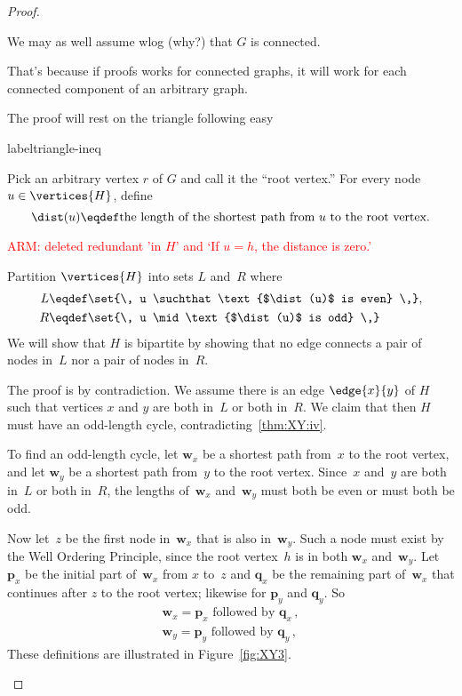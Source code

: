 \begin{proof}
\begin{description}
  We may as well assume wlog (why?) that $G$ is connected.
\begin{editingnotes}
  That's because if proofs works for connected graphs, it will work for
  each connected component of an arbitrary graph.
\end{editingnotes}

The proof will rest on the triangle following easy
\begin{lemma}label{triangle-ineq}


\end{lemma}

Pick an arbitrary vertex $r$ of $G$ and call it the ``root vertex.'' For
every node $u \in \vertices{H}$, define
\[
\dist(u)  \eqdef \text{the length of the shortest path from $u$ to
        the root vertex.}
\]
\begin{editingnotes}
\textcolor{red}{ARM: deleted redundant 'in $H$' and `If $u = h$, the distance is zero.'}
\end{editingnotes}
Partition $\vertices{H}$ into sets $L$ and~$R$ where
\begin{align*}
    L &\eqdef \set{\, u \suchthat \text{$\dist(u)$ is even} \,}, \\
    R &\eqdef \set{\, u \mid \text{$\dist(u)$ is odd} \,}
\end{align*}
We will show that $H$ is bipartite by showing that no edge connects a
pair of nodes in~$L$ nor a pair of nodes in~$R$.

The proof is by contradiction.  We assume there is an edge
$\edge{x}{y}$ of $H$ such that vertices $x$ and $y$ are both in~$L$ or
both in~$R$.  We claim that then $H$ must have an odd-length cycle,
contradicting~\ref{thm:XY:iv}.

To find an odd-length cycle, let $\mathbf{w}_x$ be a shortest path
from~$x$ to the root vertex, and let $\mathbf{w}_y$ be a shortest path
from~$y$ to the root vertex.  Since~$x$ and~$y$ are both in~$L$ or
both in~$R$, the lengths of~$\mathbf{w}_x$ and~$\mathbf{w}_y$ must
both be even or must both be odd.

Now let~$z$ be the first node in~$\mathbf{w}_x$ that is also
in~$\mathbf{w}_y$.  Such a node must exist by the Well Ordering
Principle, since the root vertex~$h$ is in both $\mathbf{w}_x$
and~$\mathbf{w}_y$.  Let $\mathbf{p}_x$ be the initial part
of~$\mathbf{w}_x$ from $x$ to~$z$ and $\mathbf{q}_x$ be the remaining
part of~$\mathbf{w}_x$ that continues after $z$ to the root vertex;
likewise for $\mathbf{p}_y$ and $\mathbf{q}_y$.  So
\begin{align}
\mathbf{w}_x = \mathbf{p}_x \text{ followed by } \mathbf{q}_x\, ,\label{wxpxqx}\\
\mathbf{w}_y = \mathbf{p}_y \text{ followed by } \mathbf{q}_y\, ,\label{wypyqy}
\end{align}
These definitions are illustrated in Figure~\ref{fig:XY3}.


\end{description}
\end{proof}
